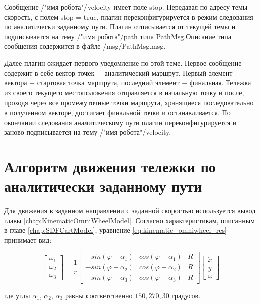 \documentclass[oneside,final,14pt]{extreport}
\begin{document}
Сообщение /"имя робота"/velocity имеет поле stop. Передавая по адресу темы скорость, с полем stop = true, плагин переконфигурируется в режим следования по аналитически заданному пути. Плагин отписывается от текущей темы и подписывается на тему /"имя робота"/path типа PathMsg.Описание типа сообщения содержится в файле /msg/PathMsg.msg. 

Далее плагин ожидает первого уведомление по этой теме. Первое сообщение содержит в себе вектор точек $-$ аналитический маршрут. Первый элемент вектора $-$ стартовая точка маршрута, последний элемент $-$ финальная. Тележка из своего текущего местоположения отправляется в начальную точку и после, проходя через все промежуточные точки маршрута, хранящиеся последовательно в полученном векторе, достигает финальной точки и останавливается. По окончании следования аналитическому пути плагин переконфигурируется и заново подписывается на тему  /"имя робота"/velocity.

\section{Алгоритм движения тележки по аналитически заданному пути}
\label{chap:cartMovingAlg}
Для движения в заданном направлении с заданной скоростью используется вывод главы \ref{chap:KinematicOmniWheelModel}. Согласно характеристикам, описанным в главе \ref{chap:SDFCartModel}, уравнение \ref{eq:kinematic_omniwheel_res} принимает вид:

\begin{equation}
\label{eq:realOmniWheelCart}
\begin{bmatrix}
\omega_{1} \\
\omega_{2} \\
\omega_{3}
\end{bmatrix}
=
\frac{1}{r}
\begin{bmatrix}
-sin(\varphi +\alpha_{1}) &
cos(\varphi +\alpha_{1}) &
R
\\
-sin(\varphi +\alpha_{2}) &
cos(\varphi +\alpha_{2}) &
R
\\
-sin(\varphi +\alpha_{3}) &
cos(\varphi +\alpha_{3}) &
R
\end{bmatrix}
\begin{bmatrix}
\dot{x} \\
\dot{y} \\
\omega
\end{bmatrix}
\end{equation}

где углы $\alpha_1$, $\alpha_2$, $\alpha_3$ равны соответственно $150, 270, 30$ градусов.
\end{document}
